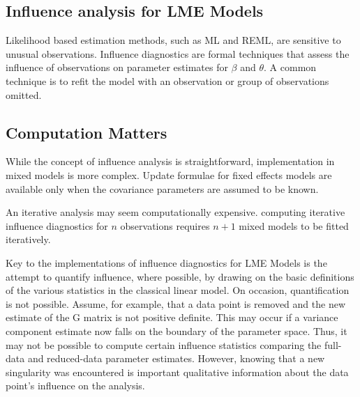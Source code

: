 \documentclass[12pt, a4paper]{report}
\theoremstyle{plain}
\theoremstyle{definition}
\theoremstyle{remark}
\begin{document}







\subsection{Influence analysis for LME Models} %


Likelihood based estimation methods, such as ML and REML, are sensitive to unusual observations. Influence diagnostics are formal techniques that assess the influence of observations on parameter estimates for $\beta$ and $\theta$. A common technique is to refit the model with an observation or group of observations omitted.





\subsection{Computation Matters}
While the concept of influence analysis is straightforward,
implementation in mixed models is more complex. Update formulae
for fixed effects models are available only when the covariance
parameters are assumed to be known.


An iterative analysis may seem computationally expensive.
computing iterative influence diagnostics for $n$ observations
requires $n+1$ mixed models to be fitted iteratively.


Key to the implementations of influence diagnostics for LME Models is the attempt to quantify influence, where possible, by drawing on the basic definitions of the various statistics in the classical linear	model. 
On occasion, quantification is not possible. Assume, for example, that a data point is removed
and the new estimate of the G matrix is not positive definite. This may occur if a variance component estimate now falls on the boundary of the parameter space. Thus, it may not be possible to compute certain influence statistics comparing the full-data and reduced-data parameter estimates. However, knowing that a new singularity was encountered is important qualitative information about the data point’s influence on	the analysis.
\end{document}
